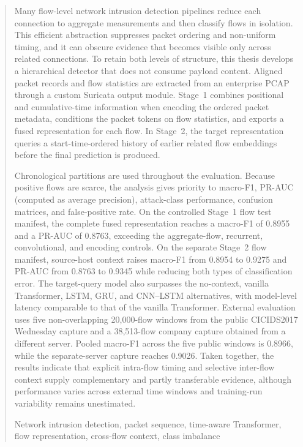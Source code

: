 \documentclass[11pt,fleqn]{report}
\begin{document}
\makecoverpage
\tableofcontents
\begin{abstract}
Many flow-level network intrusion detection pipelines reduce each connection to aggregate measurements and then classify flows in isolation. This efficient abstraction suppresses packet ordering and non-uniform timing, and it can obscure evidence that becomes visible only across related connections. To retain both levels of structure, this thesis develops a hierarchical detector that does not consume payload content. Aligned packet records and flow statistics are extracted from an enterprise PCAP through a custom Suricata output module. Stage~1 combines positional and cumulative-time information when encoding the ordered packet metadata, conditions the packet tokens on flow statistics, and exports a fused representation for each flow. In Stage~2, the target representation queries a start-time-ordered history of earlier related flow embeddings before the final prediction is produced.

Chronological partitions are used throughout the evaluation. Because positive flows are scarce, the analysis gives priority to macro-F1, PR-AUC (computed as average precision), attack-class performance, confusion matrices, and false-positive rate. On the controlled Stage~1 flow test manifest, the complete fused representation reaches a macro-F1 of 0.8955 and a PR-AUC of 0.8763, exceeding the aggregate-flow, recurrent, convolutional, and encoding controls. On the separate Stage~2 flow manifest, source-host context raises macro-F1 from 0.8954 to 0.9275 and PR-AUC from 0.8763 to 0.9345 while reducing both types of classification error. The target-query model also surpasses the no-context, vanilla Transformer, LSTM, GRU, and CNN--LSTM alternatives, with model-level latency comparable to that of the vanilla Transformer. External evaluation uses five non-overlapping 20,000-flow windows from the public CICIDS2017 Wednesday capture and a 38,513-flow company capture obtained from a different server. Pooled macro-F1 across the five public windows is 0.8966, while the separate-server capture reaches 0.9026. Taken together, the results indicate that explicit intra-flow timing and selective inter-flow context supply complementary and partly transferable evidence, although performance varies across external time windows and training-run variability remains unestimated.

  \begin{keywords}
   Network intrusion detection, packet sequence, time-aware Transformer, flow representation, cross-flow context, class imbalance
  \end{keywords}
\end{abstract}
\end{document}
